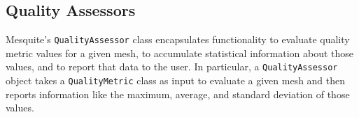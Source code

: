 \documentclass[letter]{report}
\begin{document}
\subsection{Quality Assessors}

Mesquite's \texttt{QualityAssessor} class encapsulates functionality to
evaluate quality metric values for a given mesh, to accumulate
statistical information about those values, and to report that data to
the user.  In particular, a \texttt{QualityAssessor} object takes a
{\tt QualityMetric} class as input to evaluate a given mesh and then
reports information like the maximum, average, and standard deviation
of those values.

\end{document}

